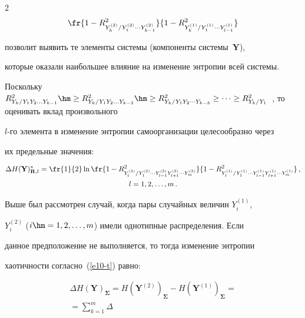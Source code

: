 \begin{multicols}{2}
\begin{align*}
\fr{1-R^2_{Y_k^{(2)}/Y_1^{(2)}\cdots Y_{k-1}^{(2)}}} {1-

R^2_{Y_k^{(1)}/Y_1^{(1)}\cdots Y_{l-1}^{(1)}}}

  \end{align*}

позволит выявить те элементы системы (компоненты системы~$\mathbf{Y}$), 

которые оказали наибольшее влияние на изменение энтропии всей сис\-темы.



  Поскольку $R^2_{Y_k/Y_1Y_2\ldots Y_{k-1}}\hm\geq 

R^2_{Y_k/Y_1Y_2\ldots Y_{k-2}} \hm\geq R^2_{Y_k/Y_1Y_2\cdots Y_{k-3}}\geq 

\cdots \geq R^2_{Y_k/Y_1}$~\cite{12-t}, то оценивать вклад произвольного 

  $l$-го элемента в изменение энтропии самоорганизации целесообразно через 

их предельные значения:

  \begin{multline*}

  \Delta H(\mathbf{Y})^*_{\mathbf{R},l} = \fr{1}{2}\ln 

  \fr{1- R^2_{Y_l^{(2)}/Y_1^{(2)}\cdots Y_{l-1}^{(2)}Y_{l+1}^{(2)}\cdots Y_m^{(2)}}} 

{1-R^2_{Y_l^{(1)}/Y_1^{(1)}\cdots Y_{l-1}^{(1)}Y_{l+1}^{(1)}\cdots Y_m^{(1)}}}\,,\\ 

l=1,2,\ldots ,m\,.

  \end{multline*}

  

  Выше был рассмотрен случай, когда пары случайных величин $Y_i^{(1)}$, 

$Y_i^{(2)}$ ($i\hm=1,2,\ldots ,m$) имели однотипные распределения. Если 

данное предположение не выполняется, то тогда изменение энтропии 

хаотичности согласно~(\ref{e10-t}) равно:

  \begin{multline*}

  \Delta H(\mathbf{Y})_{\boldsymbol{\Sigma}}= H\left(\mathbf{Y}^{(2)}\right)_{\boldsymbol{\Sigma}} - 

H\left(\mathbf{Y}^{(1)}\right)_{\boldsymbol{\Sigma}} ={}\\

{}=\sum\limits_{k=1}^m \Delta 


\end{multline*}
\end{multicols}
